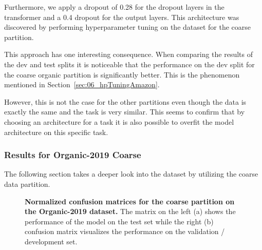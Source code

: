 Furthermore, we apply a dropout of 0.28 for the dropout layers in the transformer and a 0.4 dropout for the output layers. This architecture was discovered by performing hyperparameter tuning on the dataset for the coarse partition.
\bigskip

This approach has one interesting consequence. When comparing the results of the dev and test splits it is noticeable that the performance on the dev split for the coarse organic partition is significantly better. This is the phenomenon mentioned in Section~\ref{sec:06_hpTuningAmazon}.
\smallskip

However, this is not the case for the other partitions even though the data is exactly the same and the task is very similar. This seems to confirm that by choosing an architecture for a task it is also possible to overfit the model architecture on this specific task.


\subsubsection*{Results for Organic-2019 Coarse}
The following section takes a deeper look into the dataset by utilizing the coarse data partition.

\begin{figure}[htb]
	\centering
	
	\caption{\textbf{Normalized confusion matrices for the coarse partition on the Organic-2019 dataset.} The matrix on the left {(a)} shows the performance of the model on the test set while the right {(b)} confusion matrix visualizes the performance on the validation / development set.}
	\label{fig:06_ORG_coarse_cmatrices}
\end{figure}

